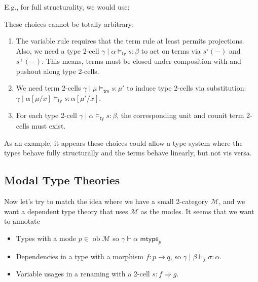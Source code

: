 \documentclass[10pt]{article}
\newcommand{\yields}{\vdash}
\newcommand{\type}{\,\,\mathsf{mtype}}
\newcommand\TypeTwo[4]{\ensuremath{#1 \mid #3 \vDash_\mathsf{ty} #2 : #4}}
\newcommand\TermTwo[4]{\ensuremath{#1 \mid #3 \vDash_\mathsf{tm} #2 : #4}}
\newcommand\TrPlus[2]{\ensuremath{#1^+(#2)}}
\newcommand\TrCirc[2]{\ensuremath{#1^\circ(#2)}}
\DeclareMathOperator{\ob}{ob}
\begin{document}
E.g., for full structurality, we would use:


These choices cannot be totally arbitrary: 
\begin{enumerate}
\item The variable rule requires that the term rule at least permits projections. Also, we need a type 2-cell $\TypeTwo{\gamma}{s}{\alpha} {\beta}$ to act on terms via $\TrCirc{s}{-}$ and $\TrPlus{s}{-}$. This means, terms must be closed under composition with and pushout along type 2-cells.
\item We need term 2-cells $\TermTwo{\gamma}{s}{\mu}{\mu'}$ to induce type 2-cells via substitution: $\TypeTwo{\gamma}{s}{\alpha[\mu/x]}{\alpha[\mu'/x]}$. 
\item For each type 2-cell $\TypeTwo{\gamma}{s}{\alpha} {\beta}$, the corresponding unit and counit term 2-cells must exist.
\end{enumerate}

As an example, it appears these choices could allow a type system where the types behave fully structurally and the terms behave linearly, but not vis versa.

\subsection{Modal Type Theories}
\newcommand{\Modes}{\mathcal{M}}

Now let's try to match the idea where we have a small 2-category $\Modes$, and we want a dependent type theory that uses $\Modes$ as the modes. It seems that we want to annotate
\begin{itemize}
\item Types with a mode $p \in \ob \Modes$ so $\gamma \yields \alpha \type_p$
\item Dependencies in a type with a morphism $f : p \to q$, so $\gamma \mid \beta \yields_f \sigma : \alpha$.
\item Variable usages in a renaming with a 2-cell $s : f \Rightarrow g$.
\end{itemize}
\end{document}
